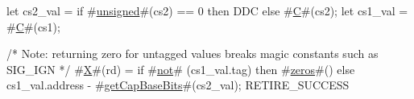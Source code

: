 let cs2_val = if #\hyperref[sailRISCVzunsigned]{unsigned}#(cs2) == 0 then DDC else #\hyperref[sailRISCVzC]{C}#(cs2);
let cs1_val = #\hyperref[sailRISCVzC]{C}#(cs1);

/* Note: returning zero for untagged values breaks magic constants such as SIG_IGN */
#\hyperref[sailRISCVzX]{X}#(rd) = if #\hyperref[sailRISCVznot]{not}# (cs1_val.tag) then
          #\hyperref[sailRISCVzzzeros]{zeros}#()
        else
          cs1_val.address - #\hyperref[sailRISCVzgetCapBaseBits]{getCapBaseBits}#(cs2_val);
RETIRE_SUCCESS

